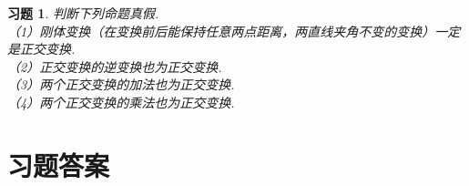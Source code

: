 \documentclass[a4paper]{book}
\newtheorem{ex}{习题}[chapter]
\begin{document}
\begin{ex}\label{8.17}
判断下列命题真假.\\
（1）刚体变换（在变换前后能保持任意两点距离，两直线夹角不变的变换）一定是正交变换.\\
（2）正交变换的逆变换也为正交变换.\\
（3）两个正交变换的加法也为正交变换.\\
（4）两个正交变换的乘法也为正交变换.
\end{ex}


\section{习题答案}
\end{document}
